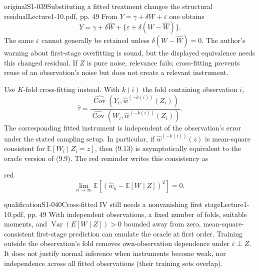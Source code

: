\begin{reviewnote}{original}{S1-039}{Substituting a fitted treatment changes the structural residual}{Lecture1-10.pdf, pp. 49}
From $Y=\gamma+\delta W+\varepsilon$ one obtains
\[
Y=\gamma+\delta\widehat W+\{\varepsilon+\delta(W-\widehat W)\}.
\]
The same $\varepsilon$ cannot generally be retained unless $\delta(W-\widehat W)=0$. The author's warning about first-stage overfitting is sound, but the displayed equivalence needs this changed residual. If $Z$ is pure noise, relevance fails; cross-fitting prevents reuse of an observation's noise but does not create a relevant instrument.
\end{reviewnote}


Use $K$-fold cross-fitting instead. With $k(i)$ the fold containing observation $i$,
\[
 \widehat\tau=
 \frac{\widehat{\operatorname{Cov}}(Y_i,\widehat w^{(-k(i))}(Z_i))}
 {\widehat{\operatorname{Cov}}(W_i,\widehat w^{(-k(i))}(Z_i))}.\tag{9.13}
\]
The corresponding fitted instrument is independent of the observation's error under the stated sampling setup. In particular, if $\widehat w^{(-k(i))}(z)$ is mean-square consistent for $\mathbb E[W_i\mid Z_i=z]$, then (9.13) is asymptotically equivalent to the oracle version of (9.9). The red reminder writes this consistency as
\begin{inkblock}{red}
\[
 \lim_{n\to\infty}\mathbb E[(\widehat w_n-\mathbb E[W\mid Z])^2]=0,
\]
\end{inkblock}
\begin{reviewnote}{qualification}{S1-040}{Cross-fitted IV still needs a nonvanishing first stage}{Lecture1-10.pdf, pp. 49}
With independent observations, a fixed number of folds, suitable moments, and $\operatorname{Var}(E[W\mid Z])>0$ bounded away from zero, mean-square-consistent first-stage prediction can emulate the oracle at first order. Training outside the observation's fold removes own-observation dependence under $\varepsilon\perp Z$. It does not justify normal inference when instruments become weak, nor independence across all fitted observations (their training sets overlap).
\end{reviewnote}



